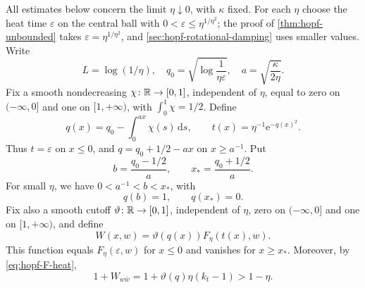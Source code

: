 All estimates below concern the limit $\eta\downarrow0$, with $\kappa$ fixed. For each $\eta$ choose the heat time $\varepsilon$ on the central ball with $0<\varepsilon\leq\eta^{1/\eta^2}$; the proof of \cref{thm:hopf-unbounded} takes $\varepsilon=\eta^{1/\eta^2}$, and \cref{sec:hopf-rotational-damping} uses smaller values. Write
\[
 L=\log(1/\eta),\quad
 q_0=\sqrt{\log\frac1{\eta\varepsilon}},\quad
 a=\sqrt{\frac\kappa{2\eta}}.
\]
Fix a smooth nondecreasing $\chi\colon \mathbb R\to[0,1]$, independent of $\eta$, equal to zero on $(-\infty,0]$ and one on $[1,+\infty)$, with $\int_0^1\chi=1/2$. Define
\begin{equation}\label{eq:hopf-scale}
 q(x)=q_0-\int_0^{ax}\chi(s)\,\mathrm{d}s,
 \qquad t(x)=\eta^{-1}\mathrm{e}^{-q(x)^2}.
\end{equation}
Thus $t=\varepsilon$ on $x\leq0$, and $q=q_0+1/2-ax$ on $x\geq a^{-1}$. Put
\[
 b=\frac{q_0-1/2}{a},\qquad
 x_* =\frac{q_0+1/2}{a}.
\]
For small $\eta$, we have $0<a^{-1}<b<x_*$, with
\begin{equation}\label{eq:hopf-scale-size}
 q(b)=1,\qquad q(x_*)=0.
\end{equation}
Fix also a smooth cutoff $\vartheta\colon \mathbb R\to[0,1]$, independent of $\eta$, zero on $(-\infty,0]$ and one on $[1,+\infty)$, and define
\[
 W(x,w)=\vartheta(q(x))F_\eta(t(x),w).
\]
This function equals $F_\eta(\varepsilon,w)$ for $x\leq0$ and vanishes for $x\geq x_*$. Moreover, by \eqref{eq:hopf-F-heat},
\begin{equation}\label{eq:hopf-vertical-positive}
 1+W_{w\bar w}=1+\vartheta(q)\eta(k_t-1)>1-\eta.
\end{equation}

